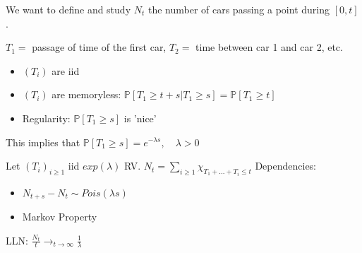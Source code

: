 \begin{ex}
	We want to define and study $N_t$ the number of cars passing a point during $[0,t]$.
\end{ex}

\begin{defn}
	$T_1 =$ passage of time of the first car, $T_2=$ time between car 1 and car 2, etc. 
\begin{itemize}
	\item $(T_i)$ are iid
	\item $(T_i)$ are memoryless:  $\mathbb{P} \left[ T_1 \geq t+s | T_1 \geq s \right] = \mathbb{P} \left[ T_1 \geq t \right] $ 
	\item Regularity: $\mathbb{P} \left[ T_1 \geq s \right] $ is 'nice'
\end{itemize}
This implies that $\mathbb{P} \left[ T_1 \geq s \right] = e^{- \lambda s}, \quad \lambda>0$
\end{defn}

Let $(T_i)_{i\geq1}$ iid $exp(\lambda)$ RV. $N_t = \sum_{i\geq1}\chi_{T_1 + ... + T_i \leq t}$ \newline
Dependencies:
\begin{itemize}
	\item $N_{t+s}-N_t \sim Pois(\lambda s)$
	\item Markov Property
\end{itemize}
LLN: $ \frac{N_t}{t} \to_{t \to \infty} \frac{1}{\lambda}$




